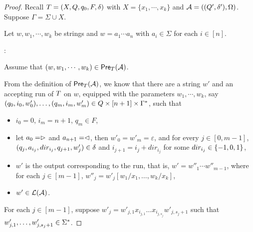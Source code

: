 \begin{proof}
Recall $T = (X, Q, q_0, F, \delta)$ with $X= \{x_1,\cdots, x_k\}$ and $\mathcal{A} =( (Q', \delta'), \Omega)$. 
Suppose $\Gamma = \Sigma \cup X$. 

Let $w, w_1, \cdots, w_k$ be strings and $w = a_1 \cdots a_n$ with $a_i \in \Sigma$ for each $i \in [n]$.

\smallskip

: 

\smallskip

Assume that $(w, w_1,\cdots, w_k) \in \textsf{Pre}_{T}(\mathcal{A})$.


From the definition of $\textsf{Pre}_{T}(\mathcal{A})$, we know that there are a string $w' $ and an accepting run of $T$ on $w$, equipped with the parameters $w_1,\cdots, w_k$, say $(q_0, i_0, w'_0),\ldots, (q_m, i_m, w'_m) \in Q \times [n+1] \times \Gamma^*$, such that 
%
\begin{itemize}
\item $i_0=0$, $i_m = n+1$, $q_m \in F$, 
%
\item let $a_0 = \vartriangleright$ and $a_{n+1} = \vartriangleleft$,  then $w'_0 = w'_m = \varepsilon$, and for every $j \in [0, m-1]$, $(q_j, a_{i_j}, dir_{i_j}, q_{j+1}, w'_j) \in
        \delta$ and $i_{j+1} = i_j + dir_{i_j}$ for some $dir_{i_j} \in \{-1, 0, 1\}$, 
 \item $w'$ is the output corresponding to the run, that is, $ w' = w''_1 \cdots w''_{m-1}$, where for each $j \in [m-1]$, $w''_j = w'_j[w_1/x_1,\ldots, w_k/x_k]$,
 \item  $w' \in \mathcal{L}(\mathcal{A})$.
\end{itemize}

For each $j \in [m-1]$, suppose $w'_j = w'_{j, 1} x_{i_{j, 1}} \ldots x_{i_{j, s_j}} w'_{j, s_j+1}$ such that $w'_{j,1}, \ldots, w'_{j, s_j +1 } \in \Sigma^*$.


\end{proof}
